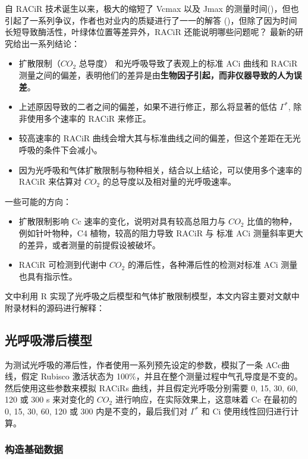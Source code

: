 \documentclass[
]{krantz}
\begin{document}
自 RACiR 技术诞生以来，极大的缩短了 Vcmax 以及 Jmax 的测量时间(\citet{stinziano2017})，但也引起了一系列争议，作者也对业内的质疑进行了一一的解答 (\citet{stinziano2018})，但除了因为时间长短导致酶活性，叶绿体位置等差异外，RACiR 还能说明哪些问题呢？\citet{stinziano2019} 最新的研究给出一系列结论：

\begin{itemize}
\item
  扩散限制（\(CO_2\) 总导度） 和光呼吸导致了表观上的标准 ACi 曲线和 RACiR 测量之间的偏差，表明他们的差异是由\textbf{生物因子引起，而非仪器导致的人为误差}。
\item
  上述原因导致的二者之间的偏差，如果不进行修正，那么将显著的低估 \(\Gamma^*\), 除非使用多个速率的 RACiR 来修正。
\item
  较高速率的 RACiR 曲线会增大其与标准曲线之间的偏差，但这个差距在无光呼吸的条件下会减小。
\item
  因为光呼吸和气体扩散限制与物种相关，结合以上结论，可以使用多个速率的 RACiR 来估算对 \(CO_2\) 的总导度以及相对量的光呼吸速率。
\end{itemize}

一些可能的方向：

\begin{itemize}
\item
  扩散限制影响 Cc 速率的变化，说明对具有较高总阻力与 \(CO_2\) 比值的物种，例如针叶物种，C4 植物，较高的阻力导致 RACiR 与 标准 ACi 测量斜率更大的差异，或者测量的前提假设被破坏。
\item
  RACiR 可检测到代谢中 \(CO_2\) 的滞后性，各种滞后性的检测对标准 ACi 测量也具有指示性。
\end{itemize}

文中利用 R 实现了光呼吸之后模型和气体扩散限制模型，本文内容主要对文献中附录材料的源码进行解释：

\hypertarget{multi2}{%
\subsection{光呼吸滞后模型}\label{multi2}}

为测试光呼吸的滞后性，作者使用一系列预先设定的参数，模拟了一条 ACc曲线，假定 Rubisco 激活状态为 100\%，并且在整个测量过程中气孔导度是不变的。然后使用这些参数来模拟 RACiRs 曲线，并且假定光呼吸分别需要 0, 15, 30, 60, 120 或 300 s 来对变化的 \(CO_2\) 进行响应，在实际效果上，这意味着 Cc 在最初的 0, 15, 30, 60, 120 或 300 内是不变的，最后我们对 \(\Gamma^*\) 和 Ci 使用线性回归进行计算。

\hypertarget{multi3}{%
\subsubsection{构造基础数据}\label{multi3}}
\end{document}
